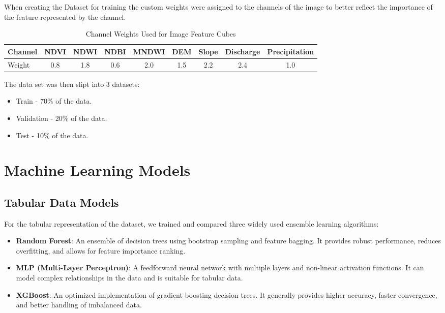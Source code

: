 \documentclass[12pt,a4paper]{article}
\begin{document}
When creating the Dataset for training the custom weights were assigned to
the channels of the image to better reflect the importance of the feature
represented by the channel. 

\begin{table}[H]
  \centering
  \caption{Channel Weights Used for Image Feature Cubes}
  \begin{tabular}{lcccccccc}
    \toprule
    Channel & NDVI & NDWI & NDBI & MNDWI & DEM & Slope & Discharge & Precipitation \\
    \midrule
    Weight  & 0.8  & 1.8  & 0.6  & 2.0   & 1.5 & 2.2   & 2.4       & 1.0 \\
    \bottomrule
  \end{tabular}
\end{table}

The data set was then slipt into 3 datasets:
\begin{itemize}
    \item Train - 70\% of the data.
    \item Validation - 20\% of the data.
    \item Test - 10\% of the data.
\end{itemize}

\section{Machine Learning Models}

\subsection{Tabular Data Models}

For the tabular representation of the dataset, we trained and compared three
widely used ensemble learning algorithms:

\begin{itemize}
  \item \textbf{Random Forest}: An ensemble of decision trees using bootstrap
  sampling and feature bagging. It provides robust performance, reduces
  overfitting, and allows for feature importance ranking.
  \item \textbf{MLP (Multi-Layer Perceptron)}: A feedforward neural network with
  multiple layers and non-linear activation functions. It can model complex
  relationships in the data and is suitable for tabular data.
  \item \textbf{XGBoost}: An optimized implementation of gradient boosting
  decision trees. It generally provides higher accuracy, faster convergence,
  and better handling of imbalanced data.
\end{itemize}
\end{document}
